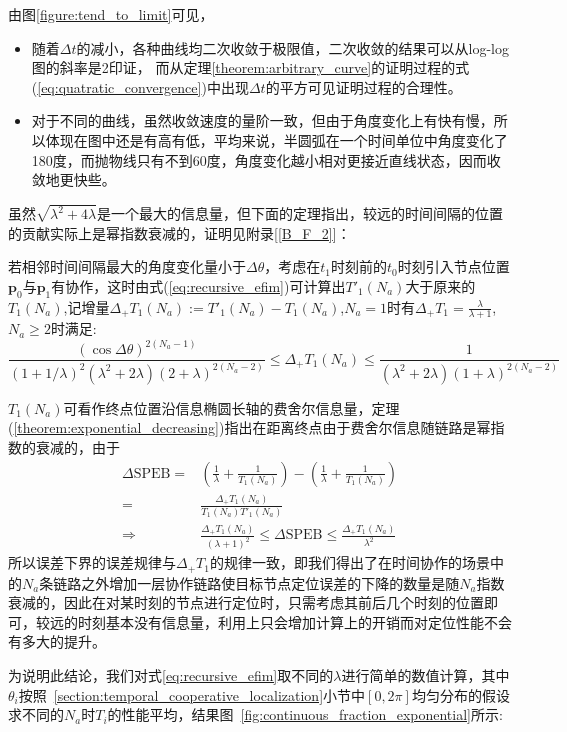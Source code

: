 由图\ref{figure:tend_to_limit}可见，
\begin{itemize}
  \item 随着$\Delta t$的减小，各种曲线均二次收敛于极限值，二次收敛的结果可以从log-log图的斜率是2印证，
而从定理\ref{theorem:arbitrary_curve}的证明过程的式(\ref{eq:quatratic_convergence})中出现$\Delta t$的平方可见证明过程的合理性。
  \item 对于不同的曲线，虽然收敛速度的量阶一致，但由于角度变化上有快有慢，所以体现在图中还是有高有低，平均来说，半圆弧在一个时间单位中角度变化了180度，而抛物线只有不到60度，角度变化越小相对更接近直线状态，因而收敛地更快些。
\end{itemize}
虽然$\sqrt{\lambda^2+4\lambda}$是一个最大的信息量，但下面的定理指出，较远的时间间隔的位置的贡献实际上是幂指数衰减的，证明见附录[\ref{B_F_2}]：
\begin{theorem}\label{theorem:exponential_decreasing}
若相邻时间间隔最大的角度变化量小于$\Delta \theta$，考虑在$t_1$时刻前的$t_0$时刻引入节点位置$\bm{p}_0$与$\bm{p}_1$有协作，这时由式(\ref{eq:recursive_efim})可计算出$T'_1(N_a)$大于原来的$T_1(N_a)$,记增量$\Delta_+ T_1(N_a):=T'_1(N_a)-T_1(N_a)$,$N_a=1$时有$\Delta_{+} T_{1}=\frac{\lambda}{\lambda+1}$,$N_a\geq 2$时满足:
\[
\frac{(\cos\Delta\theta)^{2(N_a-1)}}{(1+1/\lambda)^2(\lambda^2+2\lambda)(2+\lambda)^{2(N_a-2)}}\leq \Delta_+ T_1(N_a)\leq\frac{1}{(\lambda^2+2\lambda)(1+\lambda)^{2(N_a-2)}}
\]
\end{theorem}
\begin{remark}
$T_1(N_a)$可看作终点位置沿信息椭圆长轴的费舍尔信息量，定理(\ref{theorem:exponential_decreasing})指出在距离终点由于费舍尔信息随链路是幂指数的衰减的，由于
\begin{align*}
  \Delta \text{SPEB}=&(\frac{1}{\lambda}+\frac{1}{T_1(N_a)})-(\frac{1}{\lambda}+\frac{1}{T_1(N_a)})\\
  =&\frac{\Delta_+ T_1(N_a)}{T_1(N_a)T'_1(N_a)}\\
  \Longrightarrow &\frac{\Delta_+ T_1(N_a)}{(\lambda+1)^2}\leq  \Delta \text{SPEB} \leq \frac{\Delta_+ T_1(N_a)}{\lambda^2}
\end{align*}
所以误差下界的误差规律与$\Delta_{+} T_{1}$的规律一致，即我们得出了在时间协作的场景中的$N_a$条链路之外增加一层协作链路使目标节点定位误差的下降的数量是随$N_a$指数衰减的，因此在对某时刻的节点进行定位时，只需考虑其前后几个时刻的位置即可，较远的时刻基本没有信息量，利用上只会增加计算上的开销而对定位性能不会有多大的提升。
\end{remark}
为说明此结论，我们对式\ref{eq:recursive_efim}取不同的$\lambda$进行简单的数值计算，其中$\theta_i$按照~\ref{section:temporal_cooperative_localization}小节中$[0,2\pi]$均匀分布的假设求不同的$N_a$时$T_i$的性能平均，结果图~\ref{fig:continuous_fraction_exponential}所示:

